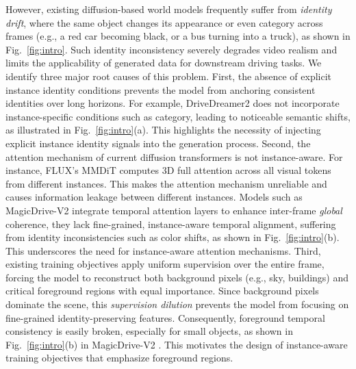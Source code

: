 \documentclass{article} %
\begin{document}
However, existing diffusion-based world models frequently suffer from \emph{identity drift}, where the same object changes its appearance or even category across frames (e.g., a red car becoming black, or a bus turning into a truck), as shown in Fig.~\ref{fig:intro}. 
Such identity inconsistency severely degrades video realism and limits the applicability of generated data for downstream driving tasks. 
We identify three major root causes of this problem.
%
First, the absence of explicit instance identity conditions prevents the model from anchoring consistent identities over long horizons. 
For example, DriveDreamer2 \cite{drivedreamer2} does not incorporate instance-specific conditions such as category, leading to noticeable semantic shifts, as illustrated in Fig.~\ref{fig:intro}(a). 
This highlights the necessity of injecting explicit instance identity signals into the generation process.
%
Second, the attention mechanism of current diffusion transformers is not instance-aware. 
For instance, FLUX's MMDiT \cite{flux2024} computes 3D full attention across all visual tokens from different instances. 
This makes the attention mechanism unreliable and causes information leakage between different instances. 
Models such as MagicDrive-V2 \cite{gao2024magicdrivedithighresolutionlongvideo} integrate temporal attention layers to enhance inter-frame \textit{global} coherence, 
they lack fine-grained, instance-aware temporal alignment, suffering from identity inconsistencies such as color shifts, as shown in Fig.~\ref{fig:intro}(b). 
This underscores the need for instance-aware attention mechanisms.
%
Third, existing training objectives \cite{wen2024panacea} apply uniform supervision over the entire frame, forcing the model to reconstruct both background pixels (e.g., sky, buildings) and critical foreground regions with equal importance. 
Since background pixels dominate the scene, this \textit{supervision dilution} prevents the model from focusing on fine-grained identity-preserving features. 
Consequently, foreground temporal consistency is easily broken, especially for small objects, as shown in Fig.~\ref{fig:intro}(b) in MagicDrive-V2 \cite{gao2024magicdrivedithighresolutionlongvideo}. 
This motivates the design of instance-aware training objectives that emphasize foreground regions.
\end{document}
